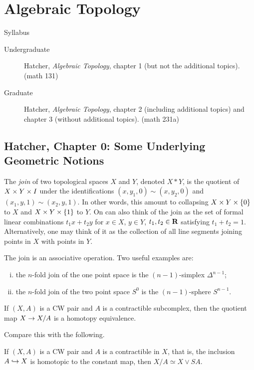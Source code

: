 \section{Algebraic Topology}
\label{S:algebraic-topology}

Syllabus
\begin{description}
\item[Undergraduate] Hatcher, \emph{Algebraic Topology}, chapter 1 (but not the additional topics). (math 131) 
\item[Graduate] Hatcher, \emph{Algebraic Topology}, chapter 2 (including additional topics) and chapter 3 (without additional topics). (math 231a)
\end{description}

\subsection{Hatcher, Chapter 0: Some Underlying Geometric Notions}

\begin{definition}
  The \emph{join} of two topological spaces $X$ and $Y$, denoted $X \ast Y$, is the quotient of $X \times Y \times I$ under the identifications $(x,y_1,0) \sim (x,y_2,0)$ and $(x_1,y,1) \sim (x_2,y,1)$. In other words, this amount to collapsing $X \times Y \times \{0\}$ to $X$ and $X \times Y \times \{1\}$ to $Y$. On can also think of the join as the set of formal linear combinations $t_1 x + t_2 y$ for $x \in X$, $y \in Y$, $t_1, t_2 \in \mathbf{R}$ satisfying $t_1 + t_2 = 1$. Alternatively, one may think of it as the collection of all line segments joining points in $X$ with points in $Y$.
\end{definition}

The join is an associative operation. Two useful examples are:
\begin{enumerate}[(i)]
\item the $n$-fold join of the one point space is the $(n-1)$-simplex $\Delta^{n-1}$;
\item the $n$-fold join of the two point space $S^0$ is the $(n-1)$-sphere $S^{n-1}$.
\end{enumerate}

\begin{proposition}
  If $(X,A)$ is a CW pair and $A$ is a contractible subcomplex, then the quotient map $X \rightarrow X/A$ is a homotopy equivalence.
\end{proposition}

Compare this with the following.

\begin{proposition}
  If $(X,A)$ is a CW pair and $A$ is a contractible in $X$, that is, the inclusion $A \hookrightarrow X$ is homotopic to the constant map, then $X/A \simeq X \vee S A$.
\end{proposition}

